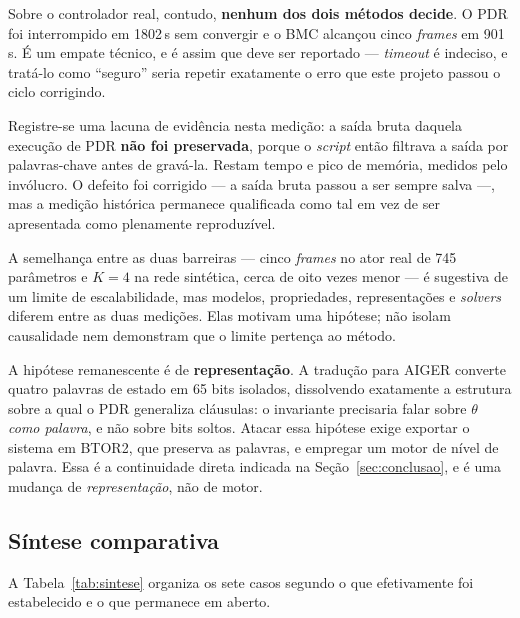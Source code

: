Sobre o controlador real, contudo, \textbf{nenhum dos dois métodos decide}. O PDR foi
interrompido em 1802\,s sem convergir e o BMC alcançou cinco \textit{frames} em 901\,s. É um
empate técnico, e é assim que deve ser reportado --- \textit{timeout} é indeciso, e tratá-lo
como ``seguro'' seria repetir exatamente o erro que este projeto passou o ciclo corrigindo.

Registre-se uma lacuna de evidência nesta medição: a saída bruta daquela execução de PDR
\textbf{não foi preservada}, porque o \textit{script} então filtrava a saída por
palavras-chave antes de gravá-la. Restam tempo e pico de memória, medidos pelo invólucro. O
defeito foi corrigido --- a saída bruta passou a ser sempre salva ---, mas a medição histórica
permanece qualificada como tal em vez de ser apresentada como plenamente reproduzível.

A semelhança entre as duas barreiras --- cinco \textit{frames} no ator real de 745 parâmetros
e $K{=}4$ na rede sintética, cerca de oito vezes menor --- é sugestiva de um limite de
escalabilidade, mas modelos, propriedades, representações e \textit{solvers} diferem entre as
duas medições. Elas motivam uma hipótese; não isolam causalidade nem demonstram que o limite
pertença ao método.

A hipótese remanescente é de \textbf{representação}. A tradução para AIGER converte quatro
palavras de estado em 65 bits isolados, dissolvendo exatamente a estrutura sobre a qual o PDR
generaliza cláusulas: o invariante precisaria falar sobre $\theta$ \emph{como palavra}, e não
sobre bits soltos. Atacar essa hipótese exige exportar o sistema em BTOR2, que preserva as
palavras, e empregar um motor de nível de palavra. Essa é a continuidade direta indicada na
Seção~\ref{sec:conclusao}, e é uma mudança de \emph{representação}, não de motor.

\subsection{Síntese comparativa}

A Tabela~\ref{tab:sintese} organiza os sete casos segundo o que efetivamente foi estabelecido
e o que permanece em aberto.

